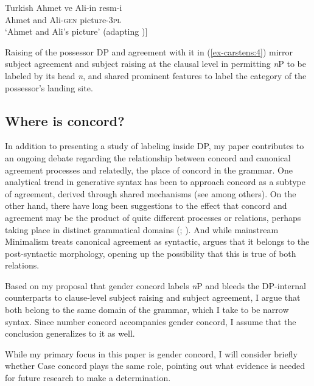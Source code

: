 \documentclass[output=paper
,modfonts
,nonflat]{langsci/langscibook}
\begin{document}
	\begin{exe}
	\ex Turkish \label{ex-carstens:4}
	\xlist
		\ex 
		\gll Ahmet ve   Ali-in     resm-i\\
		Ahmet and  Ali-\textsc{gen}   picture-3\textsc{pl}\\
		\glt `Ahmet and Ali's picture' 	
		\ex \label{ex-carstens:4b} (adapting \citealt{Abney1987})\newline
		[\textsubscript{DP} Ahmet ve Ali-in D\textsubscript{\sout{uPhi}} … [\textsubscript{\textit{n}P} <Ahmet ve Ali> \textit{n} resm]] 
		\endxlist
	\end{exe}
Raising of the possessor DP and agreement with it in (\ref{ex-carstens:4}) mirror subject agreement and subject raising at the clausal level in permitting \textit{n}P to be labeled by its head \textit{n}, and shared prominent features to label the category of the possessor's landing site. 

\subsection{Where is concord?} \label{sec-carstens:1.2}
In addition to presenting a study of labeling inside DP, my paper contributes to an ongoing debate regarding the relationship between concord and canonical agreement processes and relatedly, the place of concord in the grammar. One analytical trend in generative syntax has been to approach concord as a subtype of agreement, derived through shared mechanisms (see \citealt{Carstens1991,Carstens2000,Carstens2011,Koopman2006,Baker2008a,Danon2011,Toosarvandani_Van_Urk2014} among others). On the other hand, there have long been suggestions to the effect that concord and agreement may be the product of quite different processes or relations, perhaps taking place in distinct grammatical domains (\citealt[][fn 6]{Chomsky2001}; \citealt{Chung2013,Norris2014,Baier2015}). And while mainstream Minimalism treats canonical agreement as syntactic, \citet{Bobaljik2008} argues that it belongs to the post-syntactic morphology, opening up the possibility that this is true of both relations. 

Based on my proposal that gender concord labels \textit{n}P and bleeds the DP-in\-ter\-nal counterparts to clause-level subject raising and subject agreement, I argue that both belong to the same domain of the grammar, which I take to be narrow syntax. Since number concord accompanies gender concord, I assume that the conclusion generalizes to it as well. 

While my primary focus in this paper is gender concord, I will consider briefly whether Case concord plays the same role, pointing out what evidence is needed for future research to make a determination.
\end{document}
